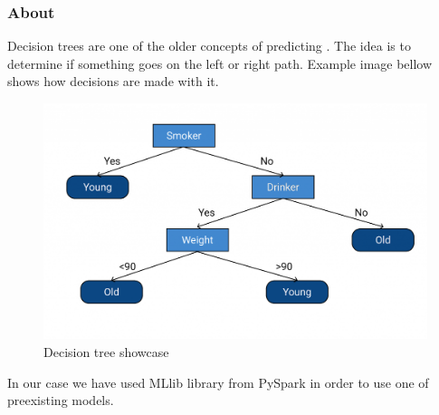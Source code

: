 \subsubsection{About}

Decision trees are one of the older concepts of predicting \parencite{friedl1997decision}. The idea is to determine if something goes on the left or right path. Example image bellow shows how decisions are made with it.
\begin{figure}[H]
    \includegraphics[scale=0.20]{img/Classification/dtree.png}
    \centering
    \caption{Decision tree showcase \parencite{web:Upgrad}}
    \label{fig:Dtree}
\end{figure}

In our case we have used MLlib library from PySpark in order to use one of preexisting models.